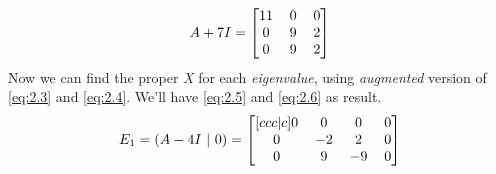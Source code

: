 \documentclass[12pt]{article}
\numberwithin{equation}{section}
\numberwithin{table}{section}
\numberwithin{figure}{section}
\begin{document}
\begin{equation}\label{eq:2.4}	
	A + 7I = 
		\renewcommand\arraystretch{1}
		\setlength\arraycolsep{6pt}
		\begin{bmatrix}
		11 & 0 & 0 \\
		0 & 9 & 2 \\
		0 & 9 & 2 \\
		\end{bmatrix}
\end{equation}
Now we can find the proper \textit{X} for each \textit{eigenvalue}, using \textit{augmented} version of \ref{eq:2.3} and \ref{eq:2.4}. We'll have \ref{eq:2.5} and \ref{eq:2.6} as result.
\begin{equation}\label{eq:2.5}
	E_1 = (A - 4I \ | \ 0)= 
	\renewcommand\arraystretch{1}
	\setlength\arraycolsep{6pt}
		\begin{bmatrix}[ccc|c]
		0 & 0 & 0 & 0\\	
		0 & -2 & 2 & 0\\
		0 & 9 & -9 & 0\\
		\end{bmatrix}
\end{equation}
\end{document}

